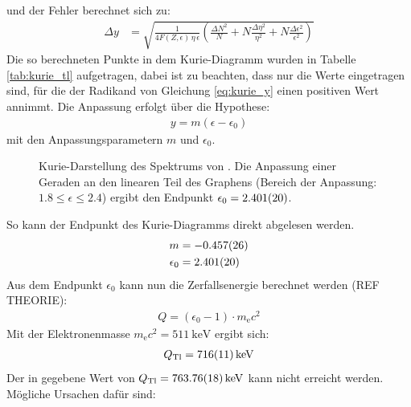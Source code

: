\documentclass[11pt, a4paper]{article}
\numberwithin{equation}{section}
\begin{document}
und der Fehler berechnet sich zu:
\begin{align}
	\Delta y &= 
	\sqrt{\frac{1}{4 F(Z, \epsilon) \, \eta \, \epsilon}
	\left( \frac{\Delta N^2}{N} + N \frac{\Delta \eta^2}{\eta^2} + N \frac{\Delta \epsilon^2}{\epsilon^2} \right)
	}
\end{align}
Die so berechneten Punkte in dem Kurie-Diagramm wurden in Tabelle \ref{tab:kurie_tl} aufgetragen, dabei ist zu beachten, dass nur die Werte eingetragen sind, für die der Radikand von Gleichung \ref{eq:kurie_y} einen positiven Wert annimmt.
Die Anpassung erfolgt über die Hypothese:
\begin{align}
	y = m (\epsilon - \epsilon_0)
\end{align}
mit den Anpassungsparametern $m$ und $\epsilon_0$.
\begin{figure}[h]
	\centering
	
	\caption{Kurie-Darstellung des Spektrums von . Die Anpassung einer Geraden an den linearen Teil des Graphens (Bereich der Anpassung: $\num{1.8} \leq \epsilon \leq {2.4}$) ergibt den Endpunkt $\epsilon_0 = \num{2.401 +- 0.020}$.}
	\label{fig:thallium_kurie}
\end{figure}
So kann der Endpunkt des Kurie-Diagramms direkt abgelesen werden.
\begin{align}
	m &= \num{-0.457 +- 0.026} \\
	\epsilon_0 &= \num{2.401 +- 0.020}
\end{align}
Aus dem Endpunkt $\epsilon_0$ kann nun die Zerfallsenergie berechnet werden (REF THEORIE):
\begin{align}
	Q = (\epsilon_0 - 1) \cdot m_\mathrm{e} c^2
\end{align}
Mit der Elektronenmasse $m_\mathrm{e} c^2 = \SI{511}{\kilo\electronvolt}$ ergibt sich:
\begin{align}
	Q_\mathrm{Tl} = \SI{716 +- 11}{\kilo\electronvolt}
\end{align}
Der in \cite{literatur_tl} gegebene Wert von $Q_\mathrm{Tl} = \SI{763.76 +- 0.18}{\kilo\electronvolt}$ kann nicht erreicht werden.
Mögliche Ursachen dafür sind:
\end{document}
